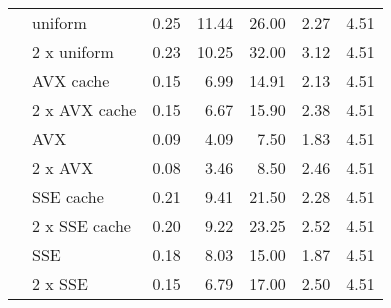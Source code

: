 \documentclass{stdlocal}
\begin{document}
\begin{tabular}{llrrrrr}
  & uniform & 0.25 & 11.44 & 26.00 & 2.27 & 4.51 \\
  & 2 x uniform & 0.23 & 10.25 & 32.00 & 3.12 & 4.51 \\
  & AVX cache & 0.15 & 6.99 & 14.91 & 2.13 & 4.51 \\
  & 2 x AVX cache & 0.15 & 6.67 & 15.90 & 2.38 & 4.51 \\
  & AVX & 0.09 & 4.09 & 7.50 & 1.83 & 4.51 \\
  & 2 x AVX & 0.08 & 3.46 & 8.50 & 2.46 & 4.51 \\
  & SSE cache & 0.21 & 9.41 & 21.50 & 2.28 & 4.51 \\
  & 2 x SSE cache & 0.20 & 9.22 & 23.25 & 2.52 & 4.51 \\
  & SSE & 0.18 & 8.03 & 15.00 & 1.87 & 4.51 \\
  & 2 x SSE & 0.15 & 6.79 & 17.00 & 2.50 & 4.51 \\
  \hline
\end{tabular}
\end{document}
